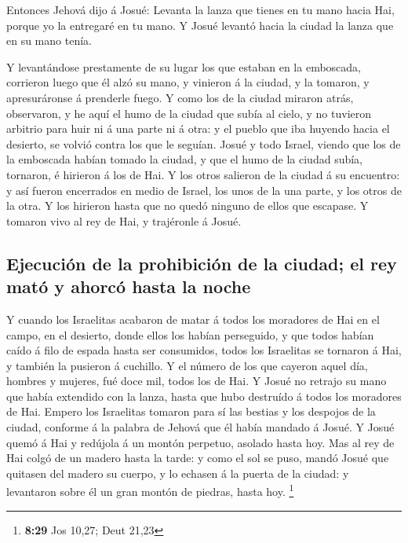  Entonces Jehová dijo á Josué: Levanta la lanza que
tienes en tu mano hacia Hai, porque yo la entregaré en tu mano. Y Josué
levantó hacia la ciudad la lanza que en su mano tenía.

 Y levantándose prestamente de su lugar los que estaban
en la emboscada, corrieron luego que él alzó su mano, y vinieron á la
ciudad, y la tomaron, y apresuráronse á prenderle fuego. 
Y como los de la ciudad miraron atrás, observaron, y he aquí el humo de
la ciudad que subía al cielo, y no tuvieron arbitrio para huir ni á una
parte ni á otra: y el pueblo que iba huyendo hacia el desierto, se
volvió contra los que le seguían.  Josué y todo Israel,
viendo que los de la emboscada habían tomado la ciudad, y que el humo de
la ciudad subía, tornaron, é hirieron á los de Hai.  Y
los otros salieron de la ciudad á su encuentro: y así fueron encerrados
en medio de Israel, los unos de la una parte, y los otros de la otra. Y
los hirieron hasta que no quedó ninguno de ellos que escapase.
 Y tomaron vivo al rey de Hai, y trajéronle á Josué.

\hypertarget{ejecuciuxf3n-de-la-prohibiciuxf3n-de-la-ciudad-el-rey-matuxf3-y-ahorcuxf3-hasta-la-noche}{%
\subsection{Ejecución de la prohibición de la ciudad; el rey mató y
ahorcó hasta la
noche}\label{ejecuciuxf3n-de-la-prohibiciuxf3n-de-la-ciudad-el-rey-matuxf3-y-ahorcuxf3-hasta-la-noche}}

 Y cuando los Israelitas acabaron de matar á todos los
moradores de Hai en el campo, en el desierto, donde ellos los habían
perseguido, y que todos habían caído á filo de espada hasta ser
consumidos, todos los Israelitas se tornaron á Hai, y también la
pusieron á cuchillo.  Y el número de los que cayeron
aquel día, hombres y mujeres, fué doce mil, todos los de Hai.
 Y Josué no retrajo su mano que había extendido con la
lanza, hasta que hubo destruído á todos los moradores de Hai.
 Empero los Israelitas tomaron para sí las bestias y los
despojos de la ciudad, conforme á la palabra de Jehová que él había
mandado á Josué.  Y Josué quemó á Hai y redújola á un
montón perpetuo, asolado hasta hoy.  Mas al rey de Hai
colgó de un madero hasta la tarde: y como el sol se puso, mandó Josué
que quitasen del madero su cuerpo, y lo echasen á la puerta de la
ciudad: y levantaron sobre él un gran montón de piedras, hasta hoy.
\footnote{\textbf{8:29} Jos 10,27; Deut 21,23}

